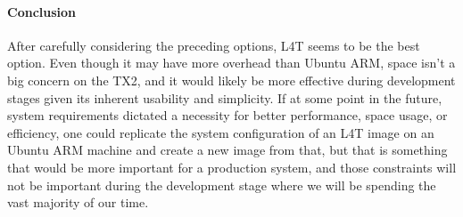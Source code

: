\paragraph{Conclusion}
After carefully considering the preceding options, L4T seems to be the best option. Even though it may have more overhead than Ubuntu ARM, space isn't a big concern on the TX2, and it would likely be more effective during development stages given its inherent usability and simplicity. If at some point in the future, system requirements dictated a necessity for better performance, space usage, or efficiency, one could replicate the system configuration of an L4T image on an Ubuntu ARM machine and create a new image from that, but that is something that would be more important for a production system, and those constraints will not be important during the development stage where we will be spending the vast majority of our time.
